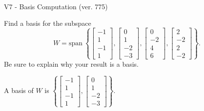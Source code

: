 \begin{exercise}
  \begin{exerciseTitle}V7 - Basis Computation (ver. 775)\end{exerciseTitle}
  \begin{exerciseStatement}
    Find a basis for the subspace 
\[W=\mathrm{span}\ \left\{\left[\begin{array}{r}
-1 \\
1 \\
-1 \\
1
\end{array}\right] , \left[\begin{array}{r}
0 \\
1 \\
-2 \\
-3
\end{array}\right] , \left[\begin{array}{r}
0 \\
-2 \\
4 \\
6
\end{array}\right] , \left[\begin{array}{r}
2 \\
-2 \\
2 \\
-2
\end{array}\right]\right\}.\]
 Be sure to explain why your result is a basis.


  \end{exerciseStatement}
  \begin{exerciseAnswer}
   A basis of \(W\) is  \(\left\{\left[\begin{array}{r}
-1 \\
1 \\
-1 \\
1
\end{array}\right] , \left[\begin{array}{r}
0 \\
1 \\
-2 \\
-3
\end{array}\right]\right\}\).
  


  \end{exerciseAnswer}
\end{exercise}